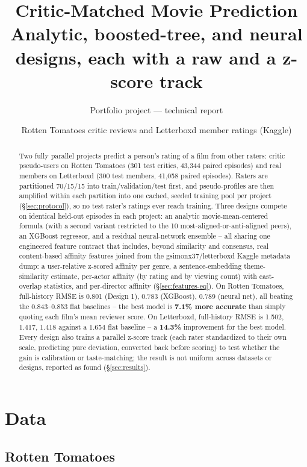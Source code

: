 \documentclass[11pt]{article}
\title{\vspace{-1.2cm}\bfseries Critic-Matched Movie Prediction\\[0.2em]
\large Analytic, boosted-tree, and neural designs, each with a raw and a z-score track}
\author{Portfolio project --- technical report}
\date{Rotten Tomatoes critic reviews and Letterboxd member ratings (Kaggle)}
\begin{document}
\maketitle
\vspace{-0.6cm}

\begin{abstract}
Two fully parallel projects predict a person's rating of a film from other raters: critic pseudo-users on Rotten Tomatoes (301 test critics, 43{,}344 paired episodes) and real members on Letterboxd (300 test members, 41{,}058 paired episodes). Raters are partitioned 70/15/15 into train/validation/test first, and pseudo-profiles are then amplified within each partition into one cached, seeded training pool per project (\S\ref{sec:protocol}), so no test rater's ratings ever reach training. Three designs compete on identical held-out episodes in each project: an analytic movie-mean-centered formula (with a second variant restricted to the 10 most-aligned-or-anti-aligned peers), an XGBoost regressor, and a residual neural-network ensemble -- all sharing one engineered feature contract that includes, beyond similarity and consensus, real content-based affinity features joined from the gsimonx37/letterboxd Kaggle metadata dump: a user-relative z-scored affinity per genre, a sentence-embedding theme-similarity estimate, per-actor affinity (by rating and by viewing count) with cast-overlap statistics, and per-director affinity (\S\ref{sec:features-eq}). On Rotten Tomatoes, full-history RMSE is 0.801 (Design 1), 0.783 (XGBoost), 0.789 (neural net), all beating the 0.843--0.853 flat baselines -- the best model is \textbf{7.1\% more accurate} than simply quoting each film's mean reviewer score. On Letterboxd, full-history RMSE is 1.502, 1.417, 1.418 against a 1.654 flat baseline -- a \textbf{14.3\%} improvement for the best model. Every design also trains a parallel z-score track (each rater standardized to their own scale, predicting pure deviation, converted back before scoring) to test whether the gain is calibration or taste-matching; the result is not uniform across datasets or designs, reported as found (\S\ref{sec:results}).
\end{abstract}

\section{Data}
\label{sec:data}

\subsection{Rotten Tomatoes}
\label{sec:data-rt}
\end{document}
